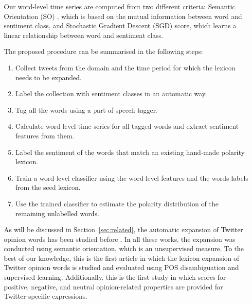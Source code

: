 \documentclass{sig-alternate}
\begin{document}


Our word-level time series are computed from two different criteria: Semantic Orientation (SO) \cite{Turney2002}, which is based on the mutual information between word and sentiment class, and Stochastic Gradient Descent (SGD) score, which learns a linear relationship between word and sentiment class.

The proposed procedure can be summarised in the following steps:

\begin{enumerate}
\item Collect tweets from the domain and the time period for which the lexicon needs to be expanded. 
\item Label the collection with sentiment classes in an automatic way.
\item Tag all the words using a part-of-speech tagger.
\item Calculate word-level time-series for all tagged words and extract sentiment features from them.
\item Label the sentiment of the words that match an existing hand-made polarity lexicon.
\item Train a word-level classifier using the word-level features and the words labels from the seed lexicon.
\item Use the trained classifier to estimate the polarity distribution of the remaining unlabelled words.
\end{enumerate}
 
As will be discussed in Section~\ref{sec:related}, the automatic expansion of Twitter  opinion words has been studied before \cite{Mohammad2013, avaya2013, Zhou2014}. In all these works, the expansion was conducted using semantic orientation, which is an unsupervised measure.  
To the best of our knowledge, this is the first article in which the lexicon expansion of Twitter opinion words is studied and evaluated using POS disambiguation and supervised learning. Additionally, this is the first study in which scores for positive, negative, and neutral opinion-related properties are provided for Twitter-specific expressions.
\end{document}

